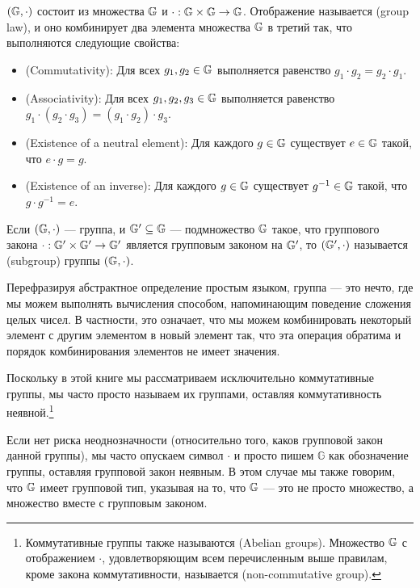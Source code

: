 \begin{definition}
\label{def:commutative_group}
 $(\mathbb{G},\cdot) $ состоит из множества $\mathbb{G}$ и  $\cdot:\mathbb{G} \times \mathbb{G} \to \mathbb{G} $. Отображение называется  (group law), и оно комбинирует два элемента множества $ \mathbb{G}$ в третий так, что выполняются следующие свойства:
\begin{itemize}
\item {} (Commutativity): Для всех $g_1,g_2\in\mathbb{G}$ выполняется равенство $g_1\cdot g_2=g_2\cdot g_1$.
\item {} (Associativity): Для всех $g_1,g_2,g_3\in\mathbb{G}$ выполняется равенство
$g_1\cdot(g_2\cdot g_3) = (g_1\cdot g_2)\cdot g_3$.
\item {} (Existence of a neutral element): Для каждого $g\in\mathbb{G}$ существует $e\in\mathbb{G}$ такой, что $e\cdot g=g$.
\item {} (Existence of an inverse): Для каждого $g\in\mathbb{G}$ существует $g^{-1}\in\mathbb{G}$ такой, что $g\cdot g^{-1}=e$.
\end{itemize}
Если $(\mathbb{G},\cdot)$ — группа, и $\mathbb{G}'\subseteq\mathbb{G}$ — подмножество $\mathbb{G}$ такое, что  группового закона $\cdot: \mathbb{G}'\times \mathbb{G}' \to \mathbb{G}'$ является групповым законом на $\mathbb{G}'$, то $(\mathbb{G}',\cdot)$ называется  (subgroup) группы $(\mathbb{G},\cdot)$.
\end{definition}

Перефразируя абстрактное определение простым языком, группа — это нечто, где мы можем выполнять вычисления способом, напоминающим поведение сложения целых чисел. В частности, это означает, что мы можем комбинировать некоторый элемент с другим элементом в новый элемент так, что эта операция обратима и порядок комбинирования элементов не имеет значения.

\begin{notation}Поскольку в этой книге мы рассматриваем исключительно коммутативные группы, мы часто просто называем их группами, оставляя коммутативность неявной.\footnote{Коммутативные группы также называются  (Abelian groups). Множество $\mathbb{G}$ с отображением $\cdot$, удовлетворяющим всем перечисленным выше правилам, кроме закона коммутативности, называется  (non-commutative group).} 

Если нет риска неоднозначности (относительно того, каков групповой закон данной группы), мы часто опускаем символ $\cdot$ и просто пишем $\mathbb{G}$ как обозначение группы, оставляя групповой закон неявным. В этом случае мы также говорим, что $\mathbb{G}$ имеет групповой тип, указывая на то, что $\mathbb{G}$ — это не просто множество, а множество вместе с групповым законом.
\end{notation}


